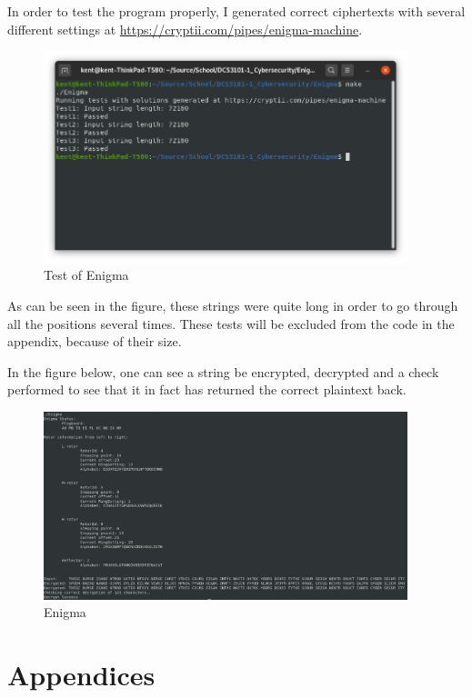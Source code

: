 \documentclass{article}
\begin{document}
In order to test the program properly, I generated correct ciphertexts with several different settings at \url{https://cryptii.com/pipes/enigma-machine}.
\begin{figure}[H]
 \centering
  \includegraphics[width=300pt]{img/enigmaTest.png}
 \caption{Test of Enigma}
 \end{figure}
As can be seen in the figure, these strings were quite long in order to go through all the positions several times. These tests will be excluded from the code in the appendix, because of their size.


In the figure below, one can see a string be encrypted, decrypted and a check performed to see that it in fact has returned the correct plaintext back.
\begin{figure}[H]
 \centering
  \includegraphics[width=300pt]{img/enigmaMan.png}
 \caption{Enigma}
 \end{figure}




\section{Appendices}
\end{document}
